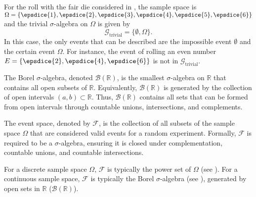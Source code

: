 \begin{example}
	\label{ex:die1a}
	For the roll with the fair die considered in , the sample space is $\Omega = \{ \epsdice{1}, \epsdice{2}, \epsdice{3}, \epsdice{4}, \epsdice{5}, \epsdice{6} \}$ and the trivial $\sigma$-algebra on $\Omega$ is given by
	\begin{equation}
		\mathcal{G}_{\text{trivial}} = \{\emptyset, \Omega\}.
	\end{equation}
	In this case, the only events that can be described are the impossible event $\emptyset$ and the certain event $\Omega$. For instance, the event of rolling an even number $E = \{\epsdice{2}, \epsdice{4}, \epsdice{6}\}$ is not in $\mathcal{G}_{\text{trivial}}$.
\end{example}

\begin{definition}
	\label{def:borel_sigma_algebra}
	The Borel $\sigma$-algebra, denoted $\mathcal{B}(\mathbb{R})$, is the smallest $\sigma$-algebra on $\mathbb{R}$ that contains all open subsets of $\mathbb{R}$.  Equivalently, $\mathcal{B}(\mathbb{R})$ is generated by the collection of open intervals $(a,b) \subset \mathbb{R}$. Thus, $\mathcal{B}(\mathbb{R})$ contains all sets that can be formed from open intervals through countable unions, intersections, and complements.  
\end{definition}

\begin{definition}
	\label{def:event_space}
	The event space, denoted by $\mathcal{F}$, is the collection of all subsets of the sample space $\Omega$ that are considered valid events for a random experiment. Formally, $\mathcal{F}$ is required to be a $\sigma$-algebra, ensuring it is closed under complementation, countable unions, and countable intersections.
\end{definition}

\begin{remark}
	For a discrete sample space $\Omega$, $\mathcal{F}$ is typically the power set of $\Omega$ (see ). For a continuous sample space, $\mathcal{F}$ is typically the Borel $\sigma$-algebra (see ), generated by open sets in $\mathbb{R}$ ($\mathcal{B}(\mathbb{R})$).
\end{remark}

